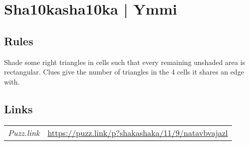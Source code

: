 \section{Sha10kasha10ka | {\normalfont Ymmi}}
\label{sec:09-sha10kasha10ka-ymmi}

\subsection*{Rules}
\begin{markdown}
Shade some right triangles in cells such that every remaining unshaded area is rectangular. Clues give the number of triangles in the 4 cells it shares an edge with.
\end{markdown}
\subsection*{Links}
\begin{tabularx}{\textwidth}{l X}
\emph{Puzz.link} & \url{https://puzz.link/p?shakashaka/11/9/natavbvajazl} \\
\end{tabularx}
\pagebreak
